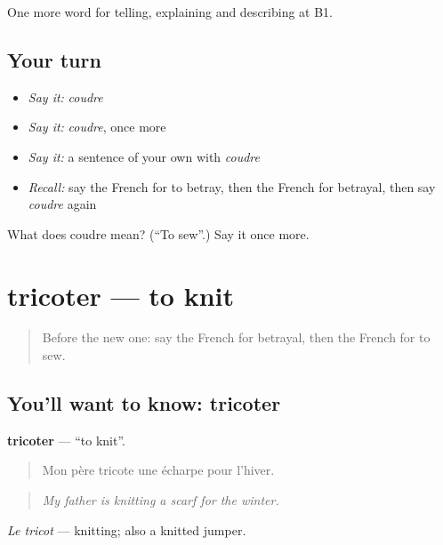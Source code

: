 \begin{grammarlens}[title={What you've built}]
One more word for telling, explaining and describing at B1.
\end{grammarlens}

\subsection*{Your turn}
\begin{itemize}
\raggedright
  \item \emph{Say it:} \emph{coudre}
  \item \emph{Say it:} \emph{coudre}, once more
  \item \emph{Say it:} a sentence of your own with \emph{coudre}
  \item \emph{Recall:} say the French for to betray, then the French for betrayal, then say \emph{coudre} again
\end{itemize}

\begin{tcolorbox}[breakable,colback=teal!4,colframe=teal!35!black,title={Before you move on}]
What does coudre mean? (\textquotedblleft{}To sew\textquotedblright{}.) Say it once more.
\end{tcolorbox}
\section[tricoter]{tricoter — to knit}

\label{lesson:FR-C496-tricoter}



\begin{quote}
Before the new one: say the French for betrayal, then the French for to sew.
\end{quote}

\subsection*{You'll want to know: tricoter}
\textbf{tricoter} — \textquotedblleft{}to knit\textquotedblright{}.

\begin{quote}
Mon père tricote une écharpe pour l'hiver.
\end{quote}

\begin{quote}
\emph{My father is knitting a scarf for the winter.}
\end{quote}

\emph{Le tricot} — knitting; also a knitted jumper.

